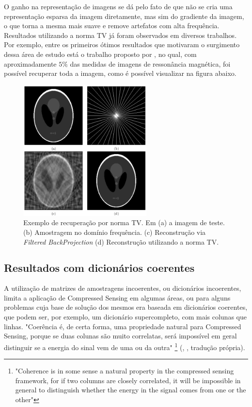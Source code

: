\documentclass[cic,tc]{iiufrgs}
\begin{document}
O ganho na representação de imagens se dá pelo fato de que não se cria uma representação esparsa da imagem
diretamente, mas sim do gradiente da imagem, o que torna a mesma mais suave e remove artefatos com alta
frequência.
Resultados utilizando a norma TV já foram observados em diversos trabalhos.
Por exemplo, entre os primeiros ótimos resultados que motivaram o surgimento dessa área de estudo está
o trabalho proposto por \citet{CandesMRI}, no qual, com aproximadamente $5\%$ das medidas de imagens de
ressonância magnética, foi possível recuperar toda a imagem, como é possível visualizar na figura 
abaixo.
\begin{figure}[H]
    \caption{Exemplo de recuperação por norma TV. Em (a) a imagem de teste.
    (b) Amostragem no domínio frequência. (c) Reconstrução via \textit{Filtered BackProjection}
    (d) Reconstrução utilizando a norma TV.}
    \begin{center}
        \includegraphics[width=0.6\textwidth]{img/candesmri}
    \end{center}
    \label{fig:l1ball}
\end{figure}

\subsection{Resultados com dicionários coerentes}
A utilização de matrizes de amostragens incoerentes, ou dicionários incoerentes, limita a aplicação de 
Compressed Sensing em algumas áreas, ou para alguns problemas cuja base de solução dos mesmos era baseada
em dicionários coerentes, que podem ser, por exemplo, um dicionário supercompleto, com mais colunas que linhas. 
"Coerência é, de certa forma, uma propriedade natural para Compressed Sensing, 
porque se duas colunas são muito correlatas, será impossível em geral distinguir se a energia do sinal
vem de uma ou da outra" 
\footnote{"Coherence is in some sense a natural property in the compressed sensing framework, for if two
columns are closely correlated, it will be impossible in general to distinguish whether the energy in 
the signal comes from one or the other"}
(\citeauthor{CANDESDICTS}, \citeyear{CANDESDICTS}, tradução própria).
\end{document}
